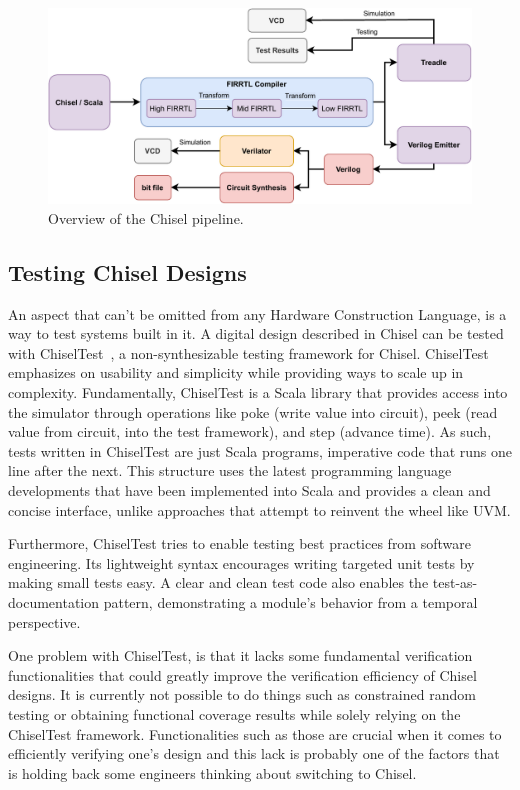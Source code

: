 \documentclass[conference]{IEEEtran}
\begin{document}
\begin{figure}
  \centering
    \includegraphics[width=0.8\linewidth]{Chisel_FIRRTL_VERILOG.pdf}
    \caption{Overview of the Chisel pipeline.}
\label{fig:chisel-pipe}
\end{figure}

\subsection{Testing Chisel Designs}
An aspect that can't be omitted from any Hardware Construction Language, is a way to test systems built in it.
A digital design described in Chisel can be tested with ChiselTest~\cite{chisel:tester2}, a non-synthesizable testing framework for Chisel.
ChiselTest emphasizes on usability and simplicity while providing ways to scale up in complexity.
Fundamentally, ChiselTest is a Scala library that provides access into the simulator through
operations like poke (write value into circuit), peek (read value from circuit, into the test framework), and step (advance time).
As such, tests written in ChiselTest are just Scala programs, imperative code that runs one line after the next.
This structure uses the latest programming language developments that have been implemented into Scala
and provides a clean and concise interface, unlike approaches that attempt to reinvent the wheel like UVM.

Furthermore, ChiselTest tries to enable testing best practices from software engineering.
Its lightweight syntax encourages writing targeted unit tests by making small tests easy.
A clear and clean test code also enables the test-as-documentation pattern,
demonstrating a module's behavior from a temporal perspective.

One problem with ChiselTest, is that it lacks some fundamental verification functionalities that could greatly improve the verification efficiency of Chisel designs. 
It is currently not possible to do things such as constrained random testing or obtaining functional coverage results while solely relying on the ChiselTest framework. 
Functionalities such as those are crucial when it comes to efficiently verifying one's design and this lack is probably one of the factors that is holding back some engineers thinking about switching to Chisel. 
\end{document}
